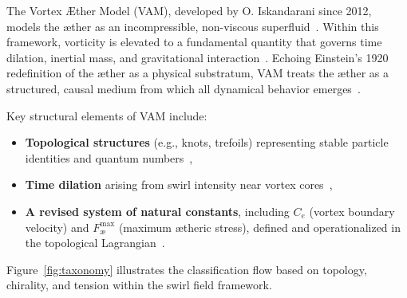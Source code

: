 The Vortex Æther Model (VAM), developed by O. Iskandarani since 2012, models the æther as an incompressible, non-viscous superfluid~\cite{VAM-8, VAM-13}. Within this framework, vorticity is elevated to a fundamental quantity that governs time dilation, inertial mass, and gravitational interaction~\cite{VAM-2, VAM-10, VAM-13}. Echoing Einstein’s 1920 redefinition of the æther as a physical substratum, VAM treats the æther as a structured, causal medium from which all dynamical behavior emerges~\cite{VAM-8}.

Key structural elements of VAM include:
\begin{itemize}
    \item \textbf{Topological structures} (e.g., knots, trefoils) representing stable particle identities and quantum numbers~\cite{VAM-8, VAM-11, VAM-14},
    \item \textbf{Time dilation} arising from swirl intensity near vortex cores~\cite{VAM-2, VAM-13},
    \item \textbf{A revised system of natural constants}, including $C_e$ (vortex boundary velocity) and $F^{\max}_{\text{\ae}}$ (maximum ætheric stress), defined and operationalized in the topological Lagrangian~\cite{VAM-14}.
\end{itemize}

Figure~\ref{fig:taxonomy} illustrates the classification flow based on topology, chirality, and tension within the swirl field framework.


